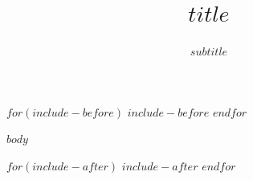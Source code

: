 \documentclass[10pt,onecolumn]{intellte}
\title{$title$}
\subtitle{$subtitle$}
\begin{document}
$for(include-before)$
$include-before$
$endfor$

\maketitle
\pagestyle{empty}
\thispagestyle{empty}

$body$

$for(include-after)$
$include-after$
$endfor$
\end{document}
